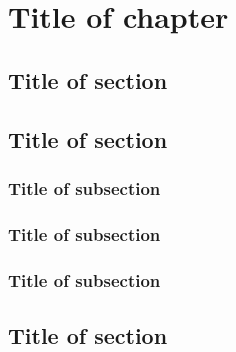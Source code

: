 \chapter{Title of chapter}

\fancyhead[RO,LE]{\thepage}

\setlength{\parskip}{0.5pt}

\bigskip

\section{Title of section} 
\noindent
\cite{azzalini01}

\section{Title of section}
\noindent
\cite{bart53}

\subsection{Title of subsection}
\noindent
\cite{brglm2}

\subsection{Title of subsection}
\noindent
\cite{staf92}

\subsection{Title of subsection}
\noindent
\cite{dicicciostern93}

\section{Title of section}
\noindent